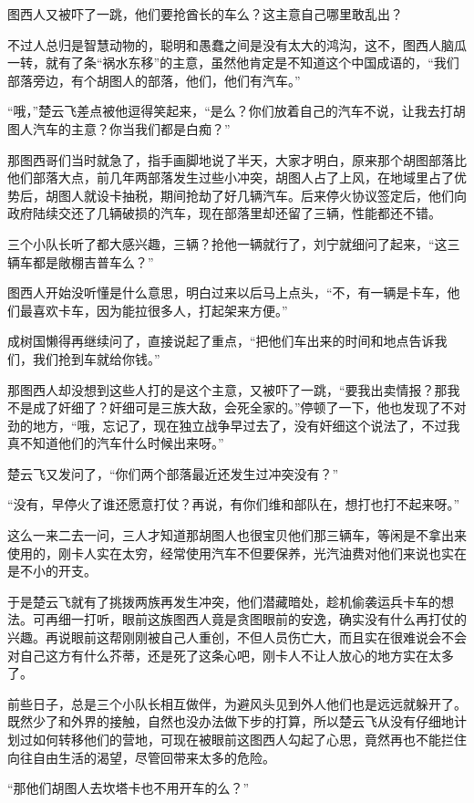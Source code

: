 图西人又被吓了一跳，他们要抢酋长的车么？这主意自己哪里敢乱出？

不过人总归是智慧动物的，聪明和愚蠢之间是没有太大的鸿沟，这不，图西人脑瓜一转，就有了条“祸水东移”的主意，虽然他肯定是不知道这个中国成语的，“我们部落旁边，有个胡图人的部落，他们，他们有汽车。”

“哦，”楚云飞差点被他逗得笑起来，“是么？你们放着自己的汽车不说，让我去打胡图人汽车的主意？你当我们都是白痴？”

那图西哥们当时就急了，指手画脚地说了半天，大家才明白，原来那个胡图部落比他们部落大点，前几年两部落发生过些小冲突，胡图人占了上风，在地域里占了优势后，胡图人就设卡抽税，期间抢劫了好几辆汽车。后来停火协议签定后，他们向政府陆续交还了几辆破损的汽车，现在部落里却还留了三辆，性能都还不错。

三个小队长听了都大感兴趣，三辆？抢他一辆就行了，刘宁就细问了起来，“这三辆车都是敞棚吉普车么？”

图西人开始没听懂是什么意思，明白过来以后马上点头，“不，有一辆是卡车，他们最喜欢卡车，因为能拉很多人，打起架来方便。”

成树国懒得再继续问了，直接说起了重点，“把他们车出来的时间和地点告诉我们，我们抢到车就给你钱。”

那图西人却没想到这些人打的是这个主意，又被吓了一跳，“要我出卖情报？那我不是成了奸细了？奸细可是三族大敌，会死全家的。”停顿了一下，他也发现了不对劲的地方，“哦，忘记了，现在独立战争早过去了，没有奸细这个说法了，不过我真不知道他们的汽车什么时候出来呀。”

楚云飞又发问了，“你们两个部落最近还发生过冲突没有？”

“没有，早停火了谁还愿意打仗？再说，有你们维和部队在，想打也打不起来呀。”

这么一来二去一问，三人才知道那胡图人也很宝贝他们那三辆车，等闲是不拿出来使用的，刚卡人实在太穷，经常使用汽车不但要保养，光汽油费对他们来说也实在是不小的开支。

于是楚云飞就有了挑拨两族再发生冲突，他们潜藏暗处，趁机偷袭运兵卡车的想法。可再细一打听，眼前这族图西人竟是贪图眼前的安逸，确实没有什么再打仗的兴趣。再说眼前这帮刚刚被自己人重创，不但人员伤亡大，而且实在很难说会不会对自己这方有什么芥蒂，还是死了这条心吧，刚卡人不让人放心的地方实在太多了。

前些日子，总是三个小队长相互做伴，为避风头见到外人他们也是远远就躲开了。既然少了和外界的接触，自然也没办法做下步的打算，所以楚云飞从没有仔细地计划过如何转移他们的营地，可现在被眼前这图西人勾起了心思，竟然再也不能拦住向往自由生活的渴望，尽管回带来太多的危险。

“那他们胡图人去坎塔卡也不用开车的么？”

